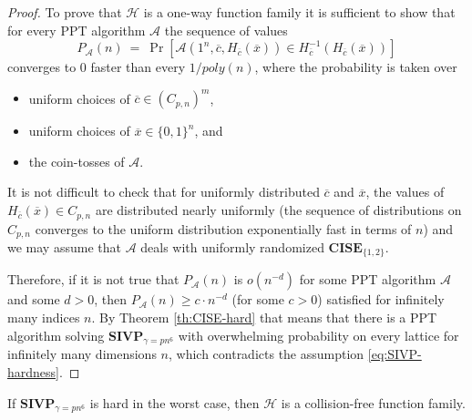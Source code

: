 \documentclass{jgcc}
\def\ovc{{\overline{c}}}
\def\ovx{{\overline{x}}}
\def\CA{{\mathcal A}}
\def\CH{{\mathcal H}}
\def\SIVP{{\mathbf{SIVP}}}
\def\CISE{{\mathbf{CISE}}}
\begin{document}
\begin{proof}
To prove that $\CH$ is a one-way function family it is sufficient to show that
for every PPT algorithm $\CA$ the sequence of values
$$
P_\CA(n)\ =\ \Pr[\CA(1^n,\ovc,H_\ovc(\ovx)) \in H_\ovc^{-1}(H_\ovc(\ovx))]
$$
converges to $0$ faster than every $1/poly(n)$,
where the probability is taken over
\begin{itemize}
\item 
uniform choices of $\ovc\in (C_{p,n})^m$,
\item 
uniform choices of $\ovx\in \{0,1\}^n$, and
\item 
the coin-tosses of $\CA$.
\end{itemize}
It is not difficult to check that 
for uniformly distributed $\ovc$ and $\ovx$,
the values of $H_\ovc(\ovx)\in C_{p,n}$ are distributed
nearly uniformly (the sequence of distributions on $C_{p,n}$ 
converges to the uniform distribution exponentially fast in terms of $n$) and
we may assume that $\CA$ deals with uniformly randomized $\CISE_{\{1,2\}}$.

Therefore, if it is not true that $P_\CA(n)$ is $o(n^{-d})$
for some PPT algorithm $\CA$ and some $d>0$, then 
$P_\CA(n) \ge c\cdot n^{-d}$ (for some $c>0$) satisfied
for infinitely many indices $n$. 
By Theorem \ref{th:CISE-hard} that means that there is a PPT algorithm 
solving $\SIVP_{\gamma=pn^6}$ with overwhelming probability 
on every lattice for infinitely many dimensions $n$, 
which contradicts the assumption \eqref{eq:SIVP-hardness}. 
\end{proof}


\begin{prop}
If $\SIVP_{\gamma=pn^6}$ is hard in the worst case, then
$\CH$ is a collision-free function family.
\end{prop}
\end{document}
